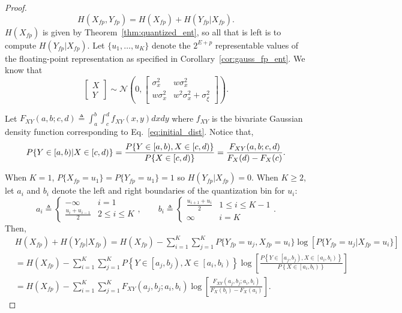 \documentclass[12pt,onecolumn, margin=1in]{IEEEtran}
\newcommand{\bracket}[1]{\left[ #1 \right]}
\newcommand{\paren}[1]{\left( #1 \right)}
\newcommand{\gauss}[2]{\mathcal{N}\paren{#1, #2}}
\newcommand{\sigx}{\sigma_x}
\newcommand{\sigxi}{\sigma_\xi}
\newcommand{\Xfp}{X_{fp}}
\newcommand{\Yfp}{Y_{fp}}
\begin{document}
\begin{proof}
\begin{equation}
     H(X_{fp}, Y_{fp}) = H(\Xfp) + H(\Yfp|\Xfp).
\end{equation}
$H(\Xfp)$ is given by Theorem~\ref{thm:quantized_ent}, so all that is left is to compute $H(\Yfp|\Xfp)$.
Let $\{u_1, \dots, u_K\}$ denote the $2^{E + p}$ representable values of the floating-point representation as specified in Corollary~\ref{cor:gauss_fp_ent}. We know that\begin{equation}
    \begin{bmatrix}
        X\\
        Y
    \end{bmatrix} \sim \gauss{0}{\begin{bmatrix}
        \sigx^2 & w\sigx^2\\
        w\sigx^2 & w^2\sigx^2 + \sigxi^2
    \end{bmatrix}}.
\end{equation}

Let $F_{XY}(a, b; c,d) \triangleq \int_a^b\int_c^d f_{XY}(x,y)dxdy$ where $f_{XY}$ is the bivariate Gaussian density function corresponding to Eq.~\eqref{eq:initial_dist}. Notice that,
\begin{equation}
    P\{Y \in [a,b)| X\in [c,d)\} = \frac{P\{Y \in [a,b), X\in [c,d)\}}{P\{X\in [c,d)\}} = \frac{F_{XY}(a, b; c,d)}{F_X(d) - F_X(c)}.\label{eq:cond_prob}\\
\end{equation}

When $K=1$, $P\{\Xfp = u_1 \} = P\{\Yfp = u_1 \} = 1$ so $H(\Yfp|\Xfp) = 0$. 
When $K \geq 2$, let $a_i$ and $b_i$ denote the left and right boundaries of the quantization bin for $u_i$:
\begin{equation}
    a_i \triangleq \begin{cases} -\infty & i = 1 \\ \frac{u_i + u_{i-1}}{2} & 2 \leq i \leq K\end{cases}, \qquad b_i \triangleq \begin{cases} \frac{u_{i+1}+u_i}{2} & 1 \leq i \leq K-1 \\ \infty & i = K\end{cases}.
\end{equation}
Then,
\begin{equation}
\begin{aligned}
    &H(\Xfp) + H(\Yfp|\Xfp) = H(\Xfp) - \sum_{i = 1}^{K}\sum_{j = 1}^K P\{\Yfp = u_j, \Xfp = u_i\}\log\bracket{P\{\Yfp = u_j | \Xfp = u_i\}}\\
    &= H(\Xfp) - \sum_{i = 1}^{K}\sum_{j = 1}^{K} P\left\{Y \in \left[a_j, b_j\right), X \in \left[a_i, b_i\right)\right\}\log\bracket{\frac{P\left\{Y \in \left[a_j, b_j\right), X \in \left[a_i, b_i\right)\right\}}{P\left\{ X \in \left[a_i, b_i\right)\right\}}}\\
    &= H(\Xfp) - \sum_{i = 1}^{K}\sum_{j = 1}^{K} F_{XY}\paren{a_j, b_j; a_i, b_i}\log\bracket{\frac{F_{XY}\paren{a_j, b_j; a_i, b_i}}{F_X(b_i) - F_X(a_i)}}.
\end{aligned}
\end{equation}

\end{proof}
\end{document}
